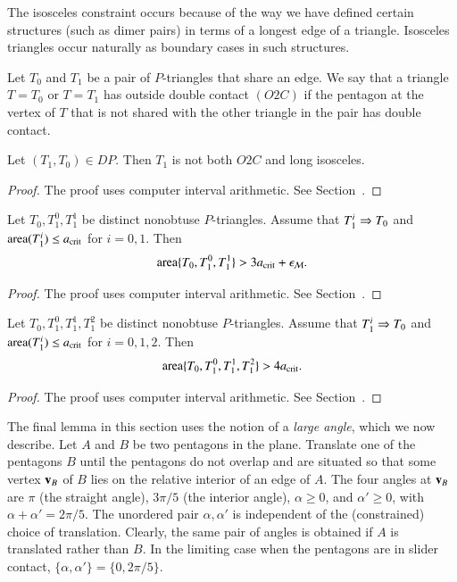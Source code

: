 The isosceles constraint occurs because of the way we have defined
certain structures (such as dimer pairs) in terms of a longest edge of a
triangle.  Isosceles triangles occur naturally as boundary cases in
such structures.

\begin{definition}[O2C]
  Let $T_0$ and $T_1$ be a pair of $P$-triangles that share an edge.
  We say that a triangle $T=T_0$ or $T=T_1$ 
  has outside double contact $(O2C)$ if the pentagon
  at the vertex of $T$ that is not shared with the other triangle in the
  pair has double contact.
\end{definition}

\begin{lemma}
  Let $(T_1,T_0)\in DP$.  Then $T_1$ is not both $O2C$ and long
  isosceles.
\end{lemma}

\begin{proof} The proof uses computer interval arithmetic. See Section~.
\end{proof}

\begin{lemma}
  Let $T_0,T_1^0,T_1^1$ be distinct
nonobtuse $P$-triangles. Assume that $T_1^i\Rightarrow T_0$ and
${\operatorname{area}}(T_1^i)\le a_\text{crit}$ for $i=0,1$. Then
\[
{\operatorname{area}}\{T_0,T_1^0,T_1^1\}>3a_\text{crit}+\epsilon_{\mathcal M}.
\]
\end{lemma}

\begin{proof} The proof uses computer interval arithmetic.  See Section~.
\end{proof}

\begin{lemma}
Let $T_0,T_1^0,T_1^1,T_1^2$ be distinct
nonobtuse $P$-triangles. Assume that $T_1^i\Rightarrow T_0$ and
${\operatorname{area}}(T_1^i)\le a_\text{crit}$ for $i=0,1,2$. Then
\[
{\operatorname{area}}\{T_0,T_1^0,T_1^1,T_1^2\}>4a_\text{crit}.
\]
\end{lemma}

\begin{proof} The proof uses computer interval arithmetic.  See Section~.
\end{proof}

The final lemma in this section uses the notion of a \emph{large
angle}, which we now describe.  Let $A$
and $B$ be two pentagons in the plane.  Translate one of the pentagons
$B$ until the pentagons do not overlap and are situated so that some
vertex ${\mathbf v}_B$ of $B$ lies on the relative interior of an edge of $A$.
The four angles at ${\mathbf v}_B$ are $\pi$ (the straight angle), $3\pi/5$
(the interior angle), $\alpha\ge0$, and $\alpha'\ge0$, with
$\alpha+\alpha'=2\pi/5$.  The unordered pair $\alpha,\alpha'$ is
independent of the (constrained) choice of translation.  Clearly, the
same pair of angles is obtained if $A$ is translated rather than $B$.
In the limiting case when the pentagons are in slider contact,
$\{\alpha,\alpha'\}=\{0,2\pi/5\}$.

